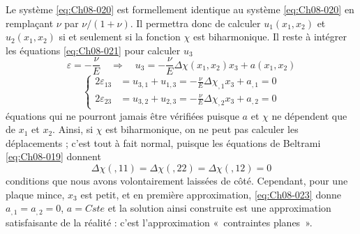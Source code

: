 Le système \eqref{eq:Ch08-020} est formellement identique au système \eqref{eq:Ch08-020} en remplaçant $\nu$ par $\nu/(1+\nu)$.
Il permettra donc de calculer $u_1(x_1,x_2)$ et $u_2(x_1,x_2)$ si et seulement si la fonction $\chi$ est biharmonique.
Il reste à intégrer les équations \eqref{eq:Ch08-021} pour calculer $u_3$ 
\begin{equation}
  \varepsilon = - \frac{\nu}{E} \quad \Rightarrow \quad u_3 = - \frac{\nu}{E} \Delta \chi(x_1,x_2)x_3+a(x_1,x_2)
\label{eq:Ch08-022}
\end{equation}
\begin{equation}
  \left\{
  \begin{aligned}
     2 \varepsilon_{13} & = u_{3,1}+u_{1,3}=-\frac{\nu}{E} \Delta \chi_{,1}x_3+a_{,1} = 0 \\
     2 \varepsilon_{23} & = u_{3,2}+u_{2,3}=-\frac{\nu}{E} \Delta \chi_{,2}x_3+a_{,2} = 0
  \end{aligned}
  \right.
\label{eq:Ch08-023}
\end{equation}
équations qui ne pourront jamais être vérifiées puisque $a$ et $\chi$ ne dépendent que de $x_1$ et $x_2$. 
Ainsi, si $\chi$ est biharmonique, on ne peut pas calculer les déplacements ; c'est tout à fait normal, puisque les équations de Beltrami \eqref{eq:Ch08-019} donnent 
\begin{equation}
  \Delta \chi(,11) = \Delta \chi(,22) = \Delta \chi(,12) = 0
\label{eq:Ch08-024}
\end{equation}
conditions que nous avons volontairement laissées de côté.
Cependant, pour une plaque mince, $x_3$ est petit, et en première approximation, \eqref{eq:Ch08-023} donne $a_{,1}=a_{,2}=0$, $a=Cste$ et la solution ainsi construite est une approximation satisfaisante de la réalité : c'est l'approximation «~contraintes planes~».
 
